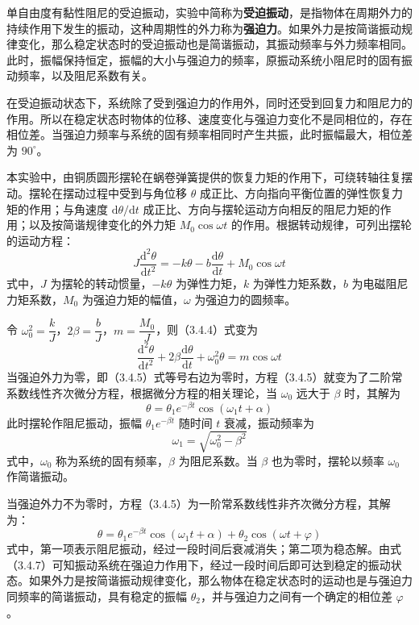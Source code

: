 单自由度有黏性阻尼的受迫振动，实验中简称为\textbf{受迫振动}，是指物体在周期外力的持续作用下发生的振动，这种周期性的外力称为\textbf{强迫力}。如果外力是按简谐振动规律变化，那么稳定状态时的受迫振动也是简谐振动，其振动频率与外力频率相同。此时，振幅保持恒定，振幅的大小与强迫力的频率，原振动系统小阻尼时的固有振动频率，以及阻尼系数有关。

在受迫振动状态下，系统除了受到强迫力的作用外，同时还受到回复力和阻尼力的作用。所以在稳定状态时物体的位移、速度变化与强迫力变化不是同相位的，存在相位差。当强迫力频率与系统的固有频率相同时产生共振，此时振幅最大，相位差为 $90^\circ$。

本实验中，由铜质圆形摆轮在蜗卷弹簧提供的恢复力矩的作用下，可绕转轴往复摆动。摆轮在摆动过程中受到与角位移 $\theta$ 成正比、方向指向平衡位置的弹性恢复力矩的作用；与角速度 $\mathrm{d}\theta/\mathrm{d}t$ 成正比、方向与摆轮运动方向相反的阻尼力矩的作用；以及按简谐规律变化的外力矩 $M_0\cos\omega t$ 的作用。根据转动规律，可列出摆轮的运动方程：
\begin{equation}
J\frac{\mathrm{d}^2\theta}{\mathrm{d}t^2}=-k\theta-b\frac{\mathrm{d}\theta}{\mathrm{d}t}+M_0\cos\omega t
\tag{3.4.4}
\end{equation}
式中，$J$ 为摆轮的转动惯量，$-k\theta$ 为弹性力矩，$k$ 为弹性力矩系数，$b$ 为电磁阻尼力矩系数，$M_0$ 为强迫力矩的幅值，$\omega$ 为强迫力的圆频率。

令 $\omega_0^2=\dfrac{k}{J}$，$2\beta=\dfrac{b}{J}$，$m=\dfrac{M_0}{J}$，则（3.4.4）式变为
\begin{equation}
\frac{\mathrm{d}^2\theta}{\mathrm{d}t^2}+2\beta\frac{\mathrm{d}\theta}{\mathrm{d}t}+\omega_0^2\theta=m\cos\omega t
\tag{3.4.5}
\end{equation}
当强迫外力为零，即（3.4.5）式等号右边为零时，方程（3.4.5）就变为了二阶常系数线性齐次微分方程，根据微分方程的相关理论，当 $\omega_0$ 远大于 $\beta$ 时，其解为
\begin{equation}
\theta=\theta_1 e^{-\beta t}\cos(\omega_1t+\alpha)
\tag{3.4.6}
\end{equation}
此时摆轮作阻尼振动，振幅 $\theta_1 e^{-\beta t}$ 随时间 $t$ 衰减，振动频率为
\[
\omega_1=\sqrt{\omega_0^2-\beta^2}
\]
式中，$\omega_0$ 称为系统的固有频率，$\beta$ 为阻尼系数。当 $\beta$ 也为零时，摆轮以频率 $\omega_0$ 作简谐振动。

当强迫外力不为零时，方程（3.4.5）为一阶常系数线性非齐次微分方程，其解为：
\begin{equation}
\theta=\theta_1 e^{-\beta t}\cos(\omega_1t+\alpha)+\theta_2\cos(\omega t+\varphi)
\tag{3.4.7}
\end{equation}
式中，第一项表示阻尼振动，经过一段时间后衰减消失；第二项为稳态解。由式（3.4.7）可知振动系统在强迫力作用下，经过一段时间后即可达到稳定的振动状态。如果外力是按简谐振动规律变化，那么物体在稳定状态时的运动也是与强迫力同频率的简谐振动，具有稳定的振幅 $\theta_2$，并与强迫力之间有一个确定的相位差 $\varphi$。

